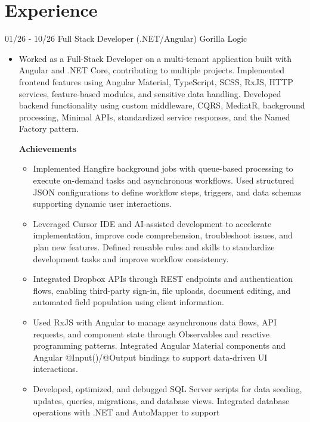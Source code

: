 \documentclass[letterpaper]{twentysecondcv} %
\begin{document}
\section{Experience}
    \begin{twenty}
        \twentyitem
        {01/26 - 10/26}
        {Full Stack Developer (.NET/Angular)}
        {Gorilla Logic}
        {
            \begin{itemize}
                \item Worked as a Full-Stack Developer on a multi-tenant application built with Angular and .NET Core, contributing to multiple projects. Implemented frontend features using Angular Material, TypeScript, SCSS, RxJS, HTTP services, feature-based modules, and sensitive data handling. Developed backend functionality using custom middleware, CQRS, MediatR, background processing, Minimal APIs, standardized service responses, and the Named Factory pattern.

                \textbf{Achievements}
                \begin{itemize}
                    \item Implemented Hangfire background jobs with queue-based processing to execute on-demand tasks and asynchronous workflows. Used structured JSON configurations to define workflow steps, triggers, and data schemas supporting dynamic user interactions.
                    \item Leveraged Cursor IDE and AI-assisted development to accelerate
                    implementation, improve code comprehension, troubleshoot issues, and plan new features. Defined reusable rules and skills to standardize development tasks and improve workflow consistency.
                    \item Integrated Dropbox APIs through REST endpoints and authentication flows, enabling third-party sign-in, file uploads, document editing, and automated field population using client information.
                    \item Used RxJS with Angular to manage asynchronous data flows, API requests, and component state through Observables and reactive programming patterns. Integrated Angular Material components and Angular @Input()/@Output bindings to support data-driven UI interactions.
                    \item  Developed, optimized, and debugged SQL Server scripts for data seeding, updates, queries, migrations, and database views. Integrated database operations with .NET and AutoMapper to support
                \end{itemize}
            

\end{itemize}}
\end{twenty}
\end{document}
